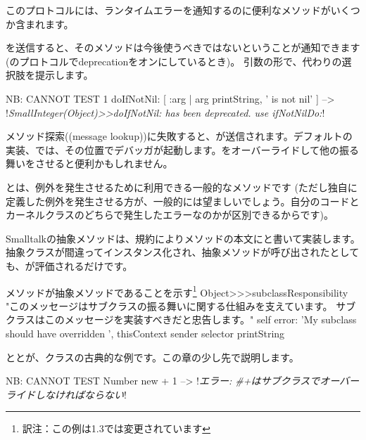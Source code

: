 \documentclass[a4paper,10pt,twoside]{book}
\begin{document}
このプロトコルには、ランタイムエラーを通知するのに便利なメソッドがいくつか含まれます。

を送信すると、そのメソッドは今後使うべきではないということが通知できます(のプロトコルでdeprecationをオンにしているとき)。
引数の形で、代わりの選択肢を提示します。

\begin{code}{NB: CANNOT TEST}
1 doIfNotNil: [ :arg | arg printString, ' is not nil' ]
  --> !\emph{SmallInteger(Object)>>doIfNotNil: has been deprecated. use ifNotNilDo:}!
\end{code}

メソッド探索((message lookup))に失敗すると、が送信されます。デフォルトの実装、\ie{}では、その位置でデバッガが起動します。をオーバーライドして他の振る舞いをさせると便利かもしれません。


とは、例外を発生させるために利用できる一般的なメソッドです
(ただし独自に定義した例外を発生させる方が、一般的には望ましいでしょう。自分のコードとカーネルクラスのどちらで発生したエラーなのかが区別できるからです)。

Smalltalkの抽象メソッドは、規約によりメソッドの本文にと書いて実装します。抽象クラスが間違ってインスタンス化され、抽象メソッドが呼び出されたとしても、が評価されるだけです。

\begin{method}{メソッドが抽象メソッドであることを示す\protect\footnote{訳注：この例は\pharo 1.3では変更されています}}
Object>>>subclassResponsibility
    "このメッセージはサブクラスの振る舞いに関する仕組みを支えています。
    サブクラスはこのメッセージを実装すべきだと忠告します。"
    self error: 'My subclass should have overridden ', thisContext sender selector printString
\end{method}

ととが、クラスの古典的な例です。この章の少し先で説明します。

\begin{code}{NB: CANNOT TEST}
Number new + 1 --> !\emph{エラー: \#+はサブクラスでオーバーライドしなければならない}!
\end{code}
\end{document}
